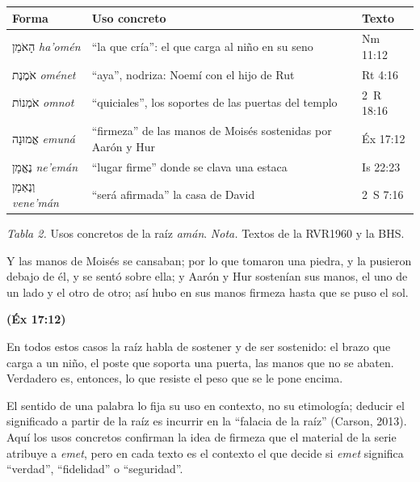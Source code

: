 \documentclass[11pt,letterpaper]{article}
\newcommand{\heb}[1]{\mbox{\foreignlanguage{hebrew}{#1}}}
\newcommand{\fuente}[1]{\par\hfill{\upshape\bfseries\small\textcolor{azul}{#1}}}
\begin{document}
\begin{center}\small\renewcommand{\arraystretch}{1.18}
\begin{tabular}{@{}L{3.3cm}L{7.4cm}L{3.6cm}@{}}
\toprule
\textbf{Forma} & \textbf{Uso concreto} & \textbf{Texto} \\ \midrule
\heb{הָאֹמֵן} \emph{ha'omén} & ``la que cría'': el que carga al niño en su seno & Nm 11:12 \\
\heb{אֹמֶנֶת} \emph{oménet} & ``aya'', nodriza: Noemí con el hijo de Rut & Rt 4:16 \\
\heb{אֹמְנוֹת} \emph{omnot} & ``quiciales'', los soportes de las puertas del templo & 2~R 18:16 \\
\heb{אֱמוּנָה} \emph{emuná} & ``firmeza'' de las manos de Moisés sostenidas por Aarón y Hur & Éx 17:12 \\
\heb{נֶאֱמָן} \emph{ne'emán} & ``lugar firme'' donde se clava una estaca & Is 22:23 \\
\heb{וְנֶאְמַן} \emph{vene'mán} & ``será afirmada'' la casa de David & 2~S 7:16 \\
\bottomrule
\end{tabular}\par
{\footnotesize\color{gris}\textit{Tabla 2.} Usos concretos de la raíz \emph{amán}. \textit{Nota.} Textos de la RVR1960 y la BHS.}
\end{center}

\begin{cita}Y las manos de Moisés se cansaban; por lo que tomaron una piedra, y la pusieron debajo de él, y se sentó sobre ella; y Aarón y Hur sostenían sus manos, el uno de un lado y el otro de otro; así hubo en sus manos firmeza hasta que se puso el sol.\fuente{(Éx 17:12)}\end{cita}

En todos estos casos la raíz habla de sostener y de ser sostenido: el brazo que carga a un niño, el poste que soporta una puerta, las manos que no se abaten. Verdadero es, entonces, lo que resiste el peso que se le pone encima.

\begin{nota}[Precisión]
El sentido de una palabra lo fija su uso en contexto, no su etimología; deducir el significado a partir de la raíz es incurrir en la ``falacia de la raíz'' (Carson, 2013). Aquí los usos concretos confirman la idea de firmeza que el material de la serie atribuye a \emph{emet}, pero en cada texto es el contexto el que decide si \emph{emet} significa ``verdad'', ``fidelidad'' o ``seguridad''.
\end{nota}
\end{document}
